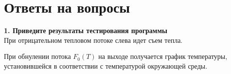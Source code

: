 \documentclass[a4paper,oneside,12pt]{extreport}
\begin{document}
\newpage 

\section{Ответы на вопросы}

\textbf{1. Приведите  результаты тестирования  программы}\\

При отрицательном тепловом потоке слева идет съем тепла.

\begin{figure}[ht!]
\end{figure}

\begin{figure}[ht!]
\end{figure}

\newpage
При обнулении потока $F_0 (T)$ на выходе получается график температуры, 
установившейся в соответствии с температурой окружающей среды.

\begin{figure}[ht!]
\end{figure}
\end{document}
